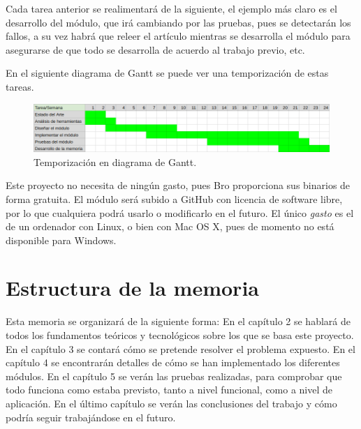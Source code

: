 Cada tarea anterior se realimentará de la siguiente, el ejemplo más claro es el desarrollo del módulo, que 
irá cambiando por las pruebas, pues se detectarán los fallos, a su vez habrá que releer el artículo mientras 
se desarrolla el módulo para asegurarse de que todo se desarrolla de acuerdo al trabajo previo, etc.

\intro En el siguiente diagrama de Gantt se puede ver una temporización de estas tareas. 

\begin{figure}[H]
  \includegraphics[width=1\textwidth]{imagenes/temporizacion.png} 
  \centering
  \caption{Temporización en diagrama de Gantt.}
\end{figure}

Este proyecto no necesita de ningún gasto, pues Bro \cite{broindex} proporciona sus binarios de 
forma gratuita. El módulo será subido a GitHub \cite{repo} con licencia de software libre, por lo que cualquiera 
podrá usarlo o modificarlo en el futuro. El único \textit{gasto} es el de un ordenador con Linux, 
o bien con Mac OS X, pues de momento no está disponible para Windows. \cite{brodownload}

\section{Estructura de la memoria}

Esta memoria se organizará de la siguiente forma: En el capítulo 2 se hablará de 
todos los fundamentos teóricos y tecnológicos sobre los que se basa este proyecto. 
En el capítulo 3 se contará cómo se pretende resolver el problema expuesto. En el 
capítulo 4 se encontrarán detalles de cómo se han implementado los diferentes módulos. 
En el capítulo 5 se verán las pruebas realizadas, para comprobar que todo funciona como 
estaba previsto, tanto a nivel funcional, como a nivel de aplicación. En el último capítulo 
se verán las conclusiones del trabajo y cómo podría seguir trabajándose en el futuro.
